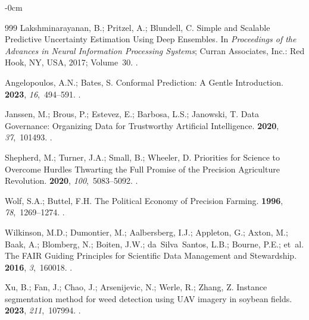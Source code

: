 \documentclass[land,review,accept,pdftex,oneauthor]{Definitions/mdpi}
\begin{document}
\begin{adjustwidth}{-\extralength}{0cm}
\begin{thebibliography}{999}
Lakshminarayanan, B.; Pritzel, A.; Blundell, C.
\newblock Simple and Scalable Predictive Uncertainty Estimation Using Deep
  Ensembles.
\newblock In \emph{Proceedings of the Advances in Neural Information Processing
  Systems}; Curran Associates, Inc.:  Red Hook, NY, USA,  2017; Volume~30.
.

Angelopoulos, A.N.; Bates, S.
\newblock Conformal Prediction: A Gentle Introduction.
 {\bf 2023}, {\em
  16},~494--591.
.

Janssen, M.; Brous, P.; Estevez, E.; Barbosa, L.S.; Janowski, T.
\newblock Data Governance: Organizing Data for Trustworthy Artificial
  Intelligence.
 {\bf 2020}, {\em 37},~101493.
.

Shepherd, M.; Turner, J.A.; Small, B.; Wheeler, D.
\newblock Priorities for Science to Overcome Hurdles Thwarting the Full Promise
  of the Precision Agriculture Revolution.
 {\bf 2020}, {\em
  100},~5083--5092.
.

Wolf, S.A.; Buttel, F.H.
\newblock The Political Economy of Precision Farming.
 {\bf 1996}, {\em
  78},~1269--1274.
.

Wilkinson, M.D.; Dumontier, M.; Aalbersberg, I.J.; Appleton, G.; Axton, M.;
  Baak, A.; Blomberg, N.; Boiten, J.W.; da~Silva~Santos, L.B.; Bourne, P.E.;
  et~al.
\newblock The {FAIR} Guiding Principles for Scientific Data Management and
  Stewardship.
 {\bf 2016}, {\em 3},~160018.
.

Xu, B.; Fan, J.; Chao, J.; Arsenijevic, N.; Werle, R.; Zhang, Z.
\newblock Instance segmentation method for weed detection using UAV imagery in
  soybean fields.
 {\bf 2023}, {\em
  211},~107994.
.


\end{thebibliography}
\end{adjustwidth}
\end{document}
